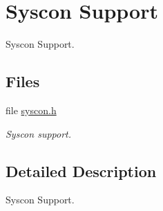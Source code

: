 \hypertarget{group__lm3s69xx__syscon}{}\section{Syscon Support}
\label{group__lm3s69xx__syscon}


Syscon Support.  


\subsection*{Files}
\begin{DoxyCompactItemize}
\item 
file \mbox{\hyperlink{syscon_8h}{syscon.\+h}}
\begin{DoxyCompactList}\small\item\em Syscon support. \end{DoxyCompactList}\end{DoxyCompactItemize}


\subsection{Detailed Description}
Syscon Support. 

